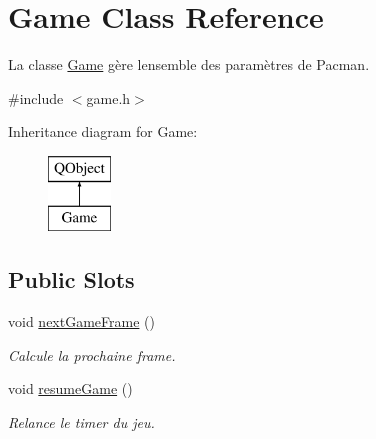 \hypertarget{class_game}{}\section{Game Class Reference}
\label{class_game}


La classe \hyperlink{class_game}{Game} gère l\textquotesingle{}ensemble des paramètres de Pacman.  




{\ttfamily \#include $<$game.\+h$>$}

Inheritance diagram for Game\+:\begin{figure}[H]
\begin{center}
\leavevmode
\includegraphics[height=2.000000cm]{class_game}
\end{center}
\end{figure}
\subsection*{Public Slots}
\begin{DoxyCompactItemize}
\item 
\hypertarget{class_game_a3c0e737b028fae5e5fc323efe6326880}{}void \hyperlink{class_game_a3c0e737b028fae5e5fc323efe6326880}{next\+Game\+Frame} ()\label{class_game_a3c0e737b028fae5e5fc323efe6326880}

\begin{DoxyCompactList}\small\item\em Calcule la prochaine frame. \end{DoxyCompactList}\item 
\hypertarget{class_game_a5ec2daf2a7fe95ee03dea84b4f5d6883}{}void \hyperlink{class_game_a5ec2daf2a7fe95ee03dea84b4f5d6883}{resume\+Game} ()\label{class_game_a5ec2daf2a7fe95ee03dea84b4f5d6883}

\begin{DoxyCompactList}\small\item\em Relance le timer du jeu. \end{DoxyCompactList}\end{DoxyCompactItemize}
